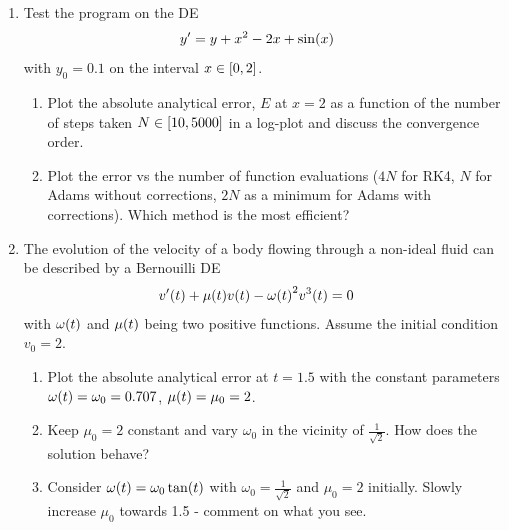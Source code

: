 \documentclass[12pt]{article}
\DeclarePairedDelimiter\rb{(}{)}
\DeclarePairedDelimiter\sqrb{[}{]}
\begin{document}
\begin{enumerate}[label=(\alph*)]
    \item 
Test the program on the DE 
\begin{align*}
    y' & =  y + x^{2} - 2 x + \sin \rb*{x} &\\ 
\end{align*}
with \(y_{0} = 0.1\) on the interval \(x \in \sqrb*{0,2}\).
     \begin{enumerate}[label=(\roman*)]
        \item Plot the absolute analytical error, \(E\) at \(x = 2\) as a function of the number of steps taken \(N \in \sqrb*{10, 5000}\) in a log-plot and discuss the convergence order.
        \item Plot the error vs the number of function evaluations (\(4N\) for RK4, \(N\) for Adams without corrections, \(2 N\) as a minimum for Adams with corrections). Which method is the most efficient? 
     \end{enumerate}
\item The evolution of the velocity of a body flowing through a non-ideal fluid can be described by a Bernouilli DE
    \begin{align*}
        v' \rb*{t} + \mu \rb*{t} v \rb*{t} - \omega \rb*{ t}^{2} v^{3} \rb*{t} & =  0 &\\
    \end{align*}
    with \(\omega\rb*{t}\) and \(\mu\rb*{t}\) being two positive functions. Assume the initial condition \(v_{0} = 2\).
    \begin{enumerate}[label=(\roman*)]
        \item Plot the absolute analytical error at \(t = 1.5\) with the constant parameters \(\omega \rb*{ t } = \omega_{0} = 0.707\), \(\mu \rb*{t} = \mu_{0} = 2\).
        \item Keep \(\mu_{0} = 2\) constant and vary \(\omega_{0}\) in the vicinity of \(\frac{1}{\sqrt{2}}\). How does the solution behave? 
        \item Consider \(\omega \rb*{t} = \omega_{0} \tan \rb*{t} \) with \(\omega_{0} = \frac{1}{\sqrt{2}}\) and \(\mu_{0} = 2\) initially. Slowly increase \(\mu_{0}\) towards 1.5 - comment on what you see.
    \end{enumerate}
\end{enumerate}
\end{document}
